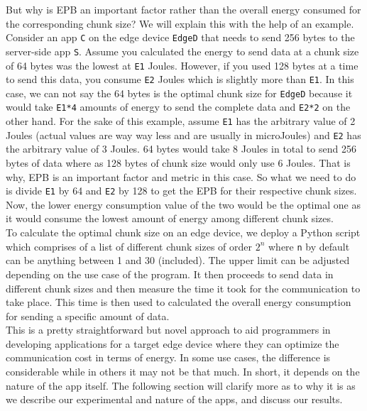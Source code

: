 But why is EPB an important factor rather than the overall energy consumed for the corresponding chunk size? 
We will explain this with the help of an example. Consider an app \texttt{C} on the edge device \texttt{EdgeD} that needs 
to send 256 bytes to the server-side app \texttt{S}. Assume you calculated the energy to send data at a 
chunk size of 64 bytes was the lowest at \texttt{E1} Joules. However, if you used 128 bytes at a time to 
send this data, you consume \texttt{E2} Joules which is slightly more than \texttt{E1}. In this case, 
we can not say the 64 bytes is the optimal chunk size for \texttt{EdgeD} because it would take \texttt{E1*4} 
amounts of energy to send the complete data and \texttt{E2*2} on the other hand. For the sake of this 
example, assume \texttt{E1} has the arbitrary value of 2 Joules (actual values are way way less and are usually 
in microJoules) and \texttt{E2} has the arbitrary value of 3 Joules. 64 bytes would take 8 Joules in total 
to send 256 bytes of data where as 128 bytes of chunk size would only use 6 Joules. That is why, EPB is an 
important factor and metric in this case. So what we need to do is divide \texttt{E1} by 64 and \texttt{E2} 
by 128 to get the EPB for their respective chunk sizes. Now, the lower energy consumption value of the 
two would be the optimal one as it would consume the lowest amount of energy among different chunk sizes. \\
To calculate the optimal chunk size on an edge device, we deploy a Python script which comprises of a 
list of different chunk sizes of order \texttt{$2^{n}$} where \texttt{n} by default can be anything between 
1 and 30 (included). The upper limit can be adjusted depending on the use case of the program. It then 
proceeds to send data in different chunk sizes and then measure the time it took for the communication to take 
place. This time is then used to calculated the overall energy consumption for sending a specific amount of 
data. \\
This is a pretty straightforward but novel approach to aid programmers in developing applications for 
a target edge device where they can optimize the communication cost in terms of energy. In some use cases, the 
difference is considerable while in others it may not be that much. In short, it depends on the nature of the app 
itself. The following section will clarify more as to why it is as we describe our experimental and nature of the 
apps, and discuss our results. \\
